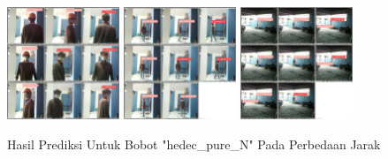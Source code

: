 \begin{enumerate}
  \begin{figure} [h!]
    \centering
    \includegraphics[width=0.3\textwidth]{gambar/BerdasarkanJarak_v2/val_hedec_pure_N/Jarak1_3/val_batch0_pred.jpg}
    \includegraphics[width=0.3\textwidth]{gambar/BerdasarkanJarak_v2/val_hedec_pure_N/Jarak5_3/val_batch0_pred.jpg}
    \includegraphics[width=0.3\textwidth]{gambar/BerdasarkanJarak_v2/val_hedec_pure_N/Jarak9/val_batch0_pred.jpg}
    \caption{Hasil Prediksi Untuk Bobot "hedec\_pure\_N" Pada Perbedaan Jarak}
    \label{fig:valjarak_sample_hedec_pure_N}  
  \end{figure}


\end{enumerate}
